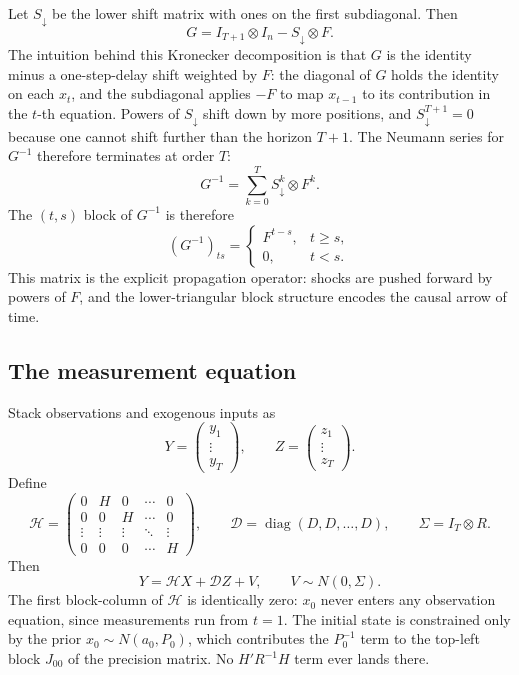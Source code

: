\documentclass[11pt]{article}
\newcommand{\diag}{\operatorname{diag}}
\begin{document}
Let $S_{\downarrow}$ be the lower shift matrix with ones on the first
subdiagonal.  Then
\begin{equation}
G=I_{T+1}\otimes I_n-S_{\downarrow}\otimes F.
\end{equation}
The intuition behind this Kronecker decomposition is that $G$ is the
identity minus a one-step-delay shift weighted by $F$: the diagonal of
$G$ holds the identity on each $x_t$, and the subdiagonal applies
$-F$ to map $x_{t-1}$ to its contribution in the $t$-th equation.
Powers of $S_{\downarrow}$ shift down by more positions, and
$S_{\downarrow}^{T+1}=0$ because one cannot shift further than the
horizon $T+1$.  The Neumann series for $G^{-1}$ therefore terminates
at order $T$:
\begin{equation}
G^{-1}=\sum_{k=0}^{T} S_{\downarrow}^k\otimes F^k.
\end{equation}
The $(t,s)$ block of $G^{-1}$ is therefore
\begin{equation}
(G^{-1})_{ts}=\begin{cases}F^{t-s},&t\ge s,\\0,&t<s.\end{cases}
\end{equation}
This matrix is the explicit propagation operator: shocks are pushed
forward by powers of $F$, and the lower-triangular block structure
encodes the causal arrow of time.

\subsection{The measurement equation}

Stack observations and exogenous inputs as
\begin{equation}
Y=\begin{pmatrix}y_1\\ \vdots\\ y_T\end{pmatrix},
\qquad
Z=\begin{pmatrix}z_1\\ \vdots\\ z_T\end{pmatrix}.
\end{equation}
Define
\begin{equation}
\mathcal H=\begin{pmatrix}
0 & H & 0 & \cdots & 0\\
0 & 0 & H & \cdots & 0\\
\vdots & \vdots & \vdots & \ddots & \vdots\\
0 & 0 & 0 & \cdots & H
\end{pmatrix},\qquad
\mathcal D=\diag(D,D,\ldots,D),\qquad
\Sigma=I_T\otimes R.
\end{equation}
Then
\begin{equation}
Y=\mathcal HX+\mathcal D Z+V,\qquad V\sim N(0,\Sigma).
\label{eq:meas}
\end{equation}
The first block-column of $\mathcal H$ is identically zero: $x_0$ never
enters any observation equation, since measurements run from $t=1$.
The initial state is constrained only by the prior $x_0\sim N(a_0,P_0)$,
which contributes the $P_0^{-1}$ term to the top-left block $J_{00}$ of
the precision matrix.  No $H'R^{-1}H$ term ever lands there.
\end{document}
